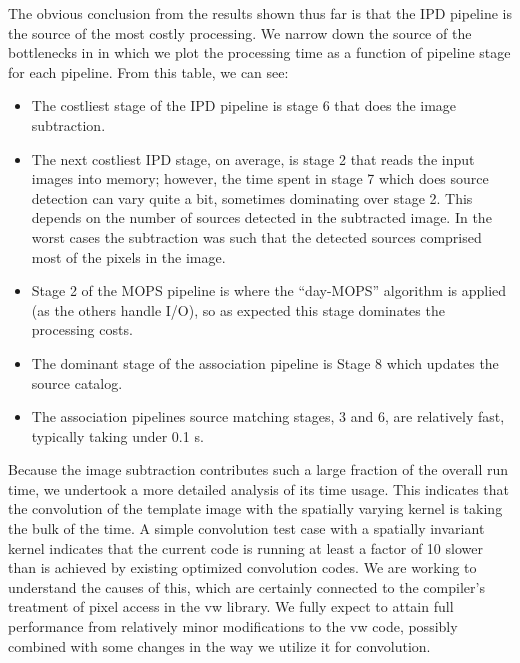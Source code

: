 The obvious conclusion from the results shown thus far is that the
IPD pipeline is the source of the most costly processing.  We narrow
down the source of the bottlenecks in  in which we
plot the processing time as a function of pipeline stage for each
pipeline.  From this table, we can see:
\begin{itemize}
\item The costliest stage of the IPD pipeline is stage 6 that does
  the image subtraction.  
\item The next costliest IPD stage, on average, is stage 2 that
  reads the input images into memory; however, the time spent in stage
  7 which does source detection can vary quite a bit, sometimes
  dominating over stage 2.  This depends on the number of sources
  detected in the subtracted image. In the worst cases the subtraction
  was such that the detected sources comprised most of the pixels
  in the image.
\item Stage 2 of the MOPS pipeline is where the ``day-MOPS'' algorithm
  is applied (as the others handle I/O), so as expected this stage
  dominates the processing costs.  
\item The dominant stage of the association pipeline is Stage 8 which
  updates the source catalog.  
\item The association pipelines source matching stages, 3 and 6, are
  relatively fast, typically taking under 0.1 s.  
\end{itemize}

Because the image subtraction contributes such a large fraction of the
overall run time, we undertook a more detailed analysis of its time
usage.  This indicates that the convolution of the template image with
the spatially varying kernel is taking the bulk of the time.   A
simple convolution test case with a spatially invariant kernel
indicates that the current code is running at least a factor of 10
slower than is achieved by existing optimized convolution codes.  We are
working to understand the causes of this, which are certainly
connected to the compiler's treatment of pixel access in the vw
library.  We fully expect to attain full performance from relatively
minor modifications to the vw code, possibly combined with some
changes in the way we utilize it for convolution.

